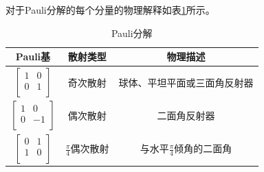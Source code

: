 对于Pauli分解的每个分量的物理解释如表\ref{Pauli table}所示。
\begin{table}[h]
  \caption{Pauli分解}
  \linespread{1.5} %
  \setlength{\arraycolsep}{10pt} %
  \begin{tabular}{|c|c|c|}
    \hline
    Pauli基                 & 散射类型                & 物理描述                             \\ \hline
    $\left[ \begin{matrix}
                  1 & 0 \\
                  0 & 1 \\
                \end{matrix} \right] $ & 奇次散射                & 球体、平坦平面或三面角反射器           \\ \hline
    $\left[ \begin{matrix}
                  1 & 0  \\
                  0 & -1 \\
                \end{matrix} \right] $ & 偶次散射                & 二面角反射器                   \\ \hline
    $\left[ \begin{matrix}
                  0 & 1 \\
                  1 & 0 \\
                \end{matrix} \right] $ & $\frac{\pi}{4}$偶次散射 & 与水平$\frac{\pi}{4}$倾角的二面角 \\ \hline
  \end{tabular}
  \label{Pauli table}
\end{table}

